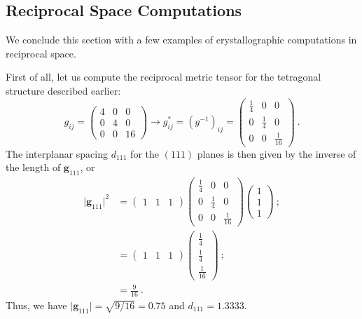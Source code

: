 \subsection{Reciprocal Space Computations}
We conclude this section with a few examples of crystallographic computations in reciprocal space.   
\begin{example}
First of all, let us compute the reciprocal metric tensor for the tetragonal structure described earlier:
\[
	g_{ij} = \left(\begin{array}{ccc}
			4 & 0 & 0\\
			0 & 4 & 0\\
			0 & 0 & 16\end{array}\right) \rightarrow g^{\ast}_{ij} = (g^{-1})_{ij} = 
	 	   \left(\begin{array}{ccc}
			\frac{1}{4} & 0 & 0\\
			0 & \frac{1}{4} & 0\\
			0 & 0 & \frac{1}{16}\end{array}\right) \ .
\]
The interplanar spacing $d_{111}$ for the $(111)$ planes is then given by the inverse of the length of $\mathbf{g}_{111}$, or
\begin{align*}
	\vert\mathbf{g}_{111}\vert^2 &= \left(\begin{array}{ccc}1& 1 & 1\end{array}\right)
			\left(\begin{array}{ccc}
			\frac{1}{4} & 0 & 0\\
			0 & \frac{1}{4} & 0\\
			0 & 0 & \frac{1}{16}\end{array}\right)
			\left(\begin{array}{c}1 \\ 1 \\ 1\end{array}\right)\ ; \\
			&=  \left(\begin{array}{ccc}1& 1 & 1\end{array}\right)
			\left(\begin{array}{c}\frac{1}{4} \\ \frac{1}{4} \\ \frac{1}{16}\end{array}\right)\ ; \\
			&= \frac{9}{16}\ .
\end{align*}
Thus, we have $\vert\mathbf{g}_{111}\vert = \sqrt{9/16} = 0.75$ and $d_{111} = 1.3333$.
\end{example}

